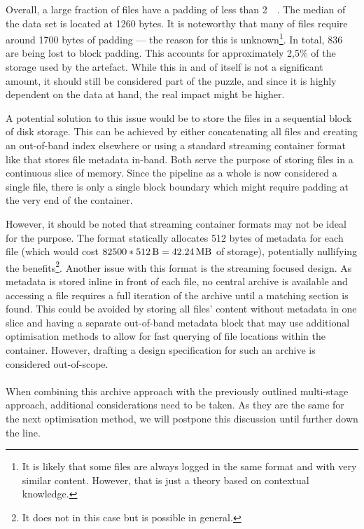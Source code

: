             
            Overall, a large fraction of files have a padding of less than \SI{2}{\kilo\byte}. The median of the data set is located at 1260 bytes. It is noteworthy that many of files require around 1700 bytes of padding — the reason for this is unknown\footnote{It is likely that some files are always logged in the same format and with very similar content. However, that is just a theory based on contextual knowledge.}. In total, \SI{836}{\mega\byte} are being lost to block padding. This accounts for approximately 2,5\% of the storage used by the artefact. While this in and of itself is not a significant amount, it should still be considered part of the puzzle, and since it is highly dependent on the data at hand, the real impact might be higher.
            
            A potential solution to this issue would be to store the files in a sequential block of disk storage. This can be achieved by either concatenating all files and creating an out-of-band index elsewhere or using a standard streaming container format like  that stores file metadata in-band. Both serve the purpose of storing files in a continuous slice of memory. Since the pipeline as a whole is now considered a single file, there is only a single block boundary which might require padding at the very end of the container.
            
            However, it should be noted that streaming container formats may not be ideal for the purpose. The  format statically allocates 512 bytes of metadata for each file (which would cost $82500 * \SI{512}{\byte} = \SI{42,24}{\mega\byte}$ of storage), potentially nullifying the benefits\footnote{It does not in this case but is possible in general.}. Another issue with this format is the streaming focused design. As metadata is stored inline in front of each file, no central archive is available and accessing a file requires a full iteration of the archive until a matching section is found. This could be avoided by storing all files' content without metadata in one slice and having a separate out-of-band metadata block that may use additional optimisation methods to allow for fast querying of file locations within the container. However, drafting a design specification for such an archive is considered out-of-scope.\\
            \\
            When combining this archive approach with the previously outlined multi-stage approach, additional considerations need to be taken. As they are the same for the next optimisation method, we will postpone this discussion until further down the line.
            
